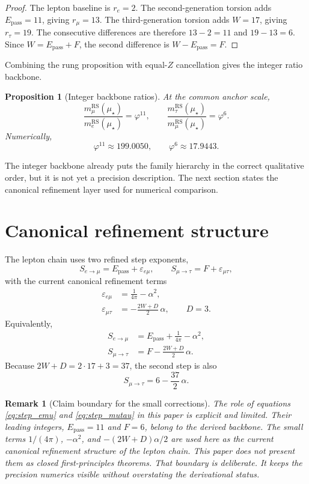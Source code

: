 \documentclass[11pt]{article}
\newtheorem{proposition}{Proposition}
\newtheorem{remark}{Remark}
\newcommand{\phig}{\varphi}
\newcommand{\mustar}{\mu_\star}
\newcommand{\Epass}{E_{\mathrm{pass}}}
\begin{document}
\begin{proof}
The lepton baseline is \(r_e=2\). The second-generation torsion adds \(\Epass=11\), giving \(r_\mu=13\). The third-generation torsion adds \(W=17\), giving \(r_\tau=19\). The consecutive differences are therefore \(13-2=11\) and \(19-13=6\). Since \(W=\Epass+F\), the second difference is \(W-\Epass=F\).
\end{proof}

Combining the rung proposition with equal-\(Z\) cancellation gives the integer ratio backbone.

\begin{proposition}[Integer backbone ratios]
At the common anchor scale,
\[
\frac{m_\mu^{\mathrm{RS}}(\mustar)}{m_e^{\mathrm{RS}}(\mustar)}=\phig^{11},
\qquad
\frac{m_\tau^{\mathrm{RS}}(\mustar)}{m_\mu^{\mathrm{RS}}(\mustar)}=\phig^{6}.
\]
Numerically,
\[
\phig^{11}\approx 199.0050,
\qquad
\phig^6\approx 17.9443.
\]
\end{proposition}

The integer backbone already puts the family hierarchy in the correct qualitative order, but it is not yet a precision description. The next section states the canonical refinement layer used for numerical comparison.

\section{Canonical refinement structure}

The lepton chain uses two refined step exponents,
\[
S_{e\to\mu}=\Epass+\varepsilon_{e\mu},
\qquad
S_{\mu\to\tau}=F+\varepsilon_{\mu\tau},
\]
with the current canonical refinement terms
\begin{align*}
\varepsilon_{e\mu} &= \frac{1}{4\pi}-\alpha^2, \\
\varepsilon_{\mu\tau} &= -\frac{2W+D}{2}\,\alpha,
\qquad D=3.
\end{align*}
Equivalently,
\begin{align}
S_{e\to\mu} &= \Epass+\frac{1}{4\pi}-\alpha^2,
\label{eq:step_emu} \\
S_{\mu\to\tau} &= F-\frac{2W+D}{2}\,\alpha.
\label{eq:step_mutau}
\end{align}
Because \(2W+D=2\cdot17+3=37\), the second step is also
\[
S_{\mu\to\tau}=6-\frac{37}{2}\,\alpha.
\]

\begin{remark}[Claim boundary for the small corrections]
The role of equations \eqref{eq:step_emu} and \eqref{eq:step_mutau} in this paper is explicit and limited. Their leading integers, \(\Epass=11\) and \(F=6\), belong to the derived backbone. The small terms \(1/(4\pi)\), \(-\alpha^2\), and \(-(2W+D)\alpha/2\) are used here as the current canonical refinement structure of the lepton chain. This paper does not present them as closed first-principles theorems. That boundary is deliberate. It keeps the precision numerics visible without overstating the derivational status.
\end{remark}
\end{document}
